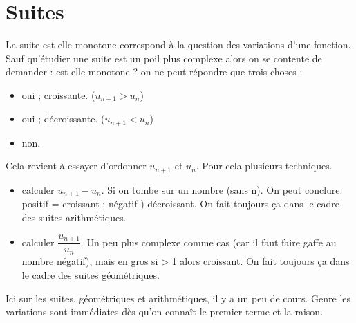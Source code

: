 \documentclass[11pt]{article}
\begin{document}

\newtheorem{Definition}{Définition}
\newtheorem{Theorem}{Théorème}
\newtheorem{Proposition}{Propriété}

\renewcommand{\labelitemi}{$\bullet$}
\renewcommand{\labelitemii}{$\circ$}

\setlength{\columnseprule}{1pt}

\section{Suites}

La suite est-elle monotone correspond à la question des variations d'une fonction. Sauf qu'étudier une suite est un poil plus complexe alors on se contente de demander : est-elle monotone ? on ne peut répondre que trois choses : 

\begin{itemize}
\item oui ; croissante. ($u_{n+1} > u_n$)
\item oui ; décroissante. ($u_{n+1} < u_n$)
\item non.
\end{itemize}

Cela revient à essayer d'ordonner $u_{n+1}$ et $u_n$. Pour cela plusieurs techniques. 

\begin{itemize}
\item calculer $u_{n+1} - u_n$. Si on tombe sur un nombre (sans n). On peut conclure. positif = croissant ; négatif ) décroissant. On fait toujours ça dans le cadre des suites arithmétiques. 
\item calculer $\dfrac{u_{n+1}}{u_n}$. Un peu plus complexe comme cas (car il faut faire gaffe au nombre négatif), mais en gros si > 1 alors croissant. On fait toujours ça dans le cadre des suites géométriques.
\end{itemize}

Ici sur les suites, géométriques et arithmétiques, il y a un peu de cours. Genre les variations sont immédiates dès qu'on connaît le premier terme et la raison.
\end{document}
